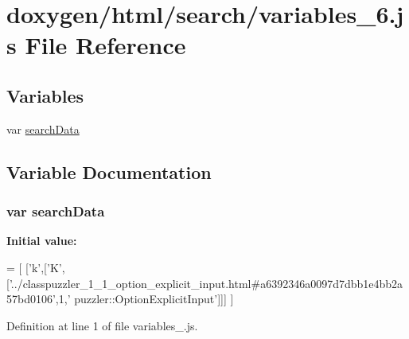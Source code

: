 \hypertarget{a00110}{}\section{doxygen/html/search/variables\+\_\+6.js File Reference}
\label{a00110}
\subsection*{Variables}
\begin{DoxyCompactItemize}
\item 
var \hyperlink{a00110_ad01a7523f103d6242ef9b0451861231e}{search\+Data}
\end{DoxyCompactItemize}


\subsection{Variable Documentation}
\hypertarget{a00110_ad01a7523f103d6242ef9b0451861231e}{}
\subsubsection[{search\+Data}]{\setlength{\rightskip}{0pt plus 5cm}var search\+Data}\label{a00110_ad01a7523f103d6242ef9b0451861231e}
{\bfseries Initial value\+:}
\begin{DoxyCode}
=
[
  [\textcolor{charliteral}{'k'},[\textcolor{charliteral}{'K'},[\textcolor{stringliteral}{'../classpuzzler\_1\_1\_option\_explicit\_input.html#a6392346a0097d7dbb1e4bb2a57bd0106'},1,\textcolor{stringliteral}{'
      puzzler::OptionExplicitInput'}]]]
]
\end{DoxyCode}


Definition at line 1 of file variables\+\_.\+js.

